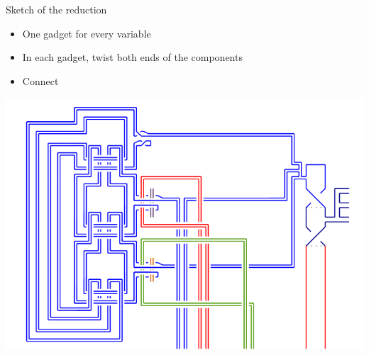 \documentclass[11pt,xcolor=dvipsnames,presentation]{beamer}
\begin{document}
\begin{frame}{Sketch of the reduction}
  \begin{itemize}
  \item One gadget for every variable
  \item In each gadget, twist both ends of the components
  \item Connect
  \end{itemize}
  \centering
 \includegraphics[width=.7\linewidth]{example.pdf} 
\end{frame}
\end{document}
